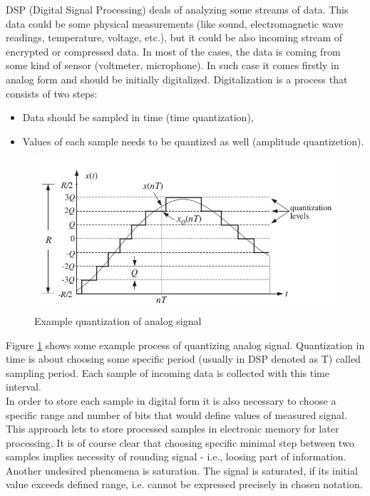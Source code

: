 \documentclass[magister]{dyplom}
\begin{document}
	\gls{DSP} (Digital Signal Processing) deals of analyzing some streams of data. This data could be some physical measurements (like sound, electromagnetic wave readings, temperature, voltage, etc.), but it could be also incoming stream of encrypted or compressed data. In most of the cases, the data is coming from some kind of sensor (voltmeter, microphone). In such case it comes firstly in analog form and should be initially digitalized. Digitalization is a process that consists of two steps:
	
	\begin{itemize}
		\item Data should be sampled in time (time quantization),
		\item Values of each sample needs to be quantized as well (amplitude quantizetion).
	\end{itemize}
	
	\begin{figure}[!th]
		\centering
		\includegraphics[width=0.7\linewidth]{images/quantization}
		\caption{Example quantization of analog signal \cite{IntroductionDSPBook}}
		\label{fig:quantization}
	\end{figure}

	
	Figure \ref{fig:quantization} shows some example process of quantizing analog signal. Quantization in time is about choosing some specific period (usually in \gls{DSP} denoted as \gls{T}) called sampling period. Each sample of incoming data is collected with this time interval. \\
	
	In order to store each sample in digital form it is also necessary to choose a specific range and number of bits that would define values of measured signal. This approach lets to store processed samples in electronic memory for later processing. It is of course clear that choosing specific minimal step between two samples implies necessity of rounding signal - i.e., loosing part of information. Another undesired phenomena is saturation. The signal is saturated, if its initial value exceeds defined range, i.e. cannot be expressed precisely in chosen notation.\\
	
\end{document}

